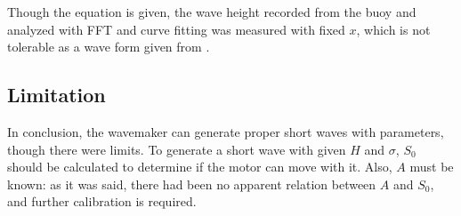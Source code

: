 Though the equation is given, the wave height recorded from the buoy and analyzed with FFT and curve fitting was measured with fixed $x$, which is not tolerable as a wave form given from \cite{madsen1970waves}.

\subsection{Limitation}

In conclusion, the wavemaker can generate proper short waves with parameters, though there were limits. To generate a short wave with given $H$ and $\sigma$, $S_{0}$ should be calculated to determine if the motor can move with it. Also, $A$ must be known: as it was said, there had been no apparent relation between $A$ and $S_{0}$, and further calibration is required.

